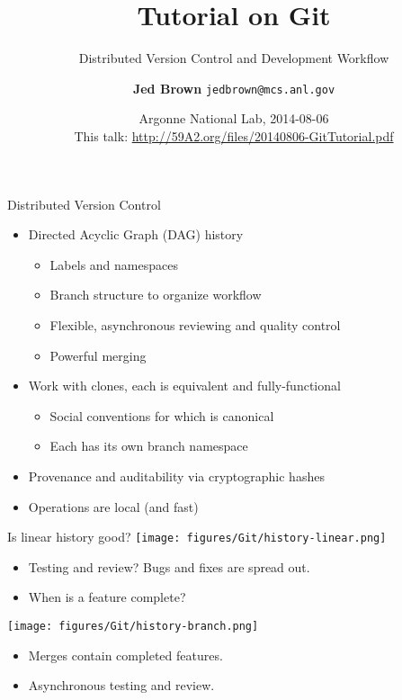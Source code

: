 \documentclass{beamer}
\title{Tutorial on Git}
\subtitle{Distributed Version Control and Development Workflow}
\author{{\bf Jed Brown} \texttt{jedbrown@mcs.anl.gov}}
\date{Argonne National Lab, 2014-08-06 \\[1em]
This talk: \url{http://59A2.org/files/20140806-GitTutorial.pdf}}
\begin{document}
\lstset{language=C}
\normalem

\begin{frame}
  \titlepage
\end{frame}

\begin{frame}{Distributed Version Control}
  \begin{itemize}
  \item Directed Acyclic Graph (DAG) history
    \begin{itemize}
    \item Labels and namespaces
    \item Branch structure to organize workflow
    \item Flexible, asynchronous reviewing and quality control
    \item Powerful merging
    \end{itemize}
  \item Work with clones, each is equivalent and fully-functional
    \begin{itemize}
    \item Social conventions for which is canonical
    \item Each has its own branch namespace
    \end{itemize}
  \item Provenance and auditability via cryptographic hashes
  \item Operations are local (and fast)
  \end{itemize}
\end{frame}

\begin{frame}{Is linear history good?}
  \texttt{[image: figures/Git/history-linear.png]}
  \begin{itemize}
  \item Testing and review?  Bugs and fixes are spread out.
  \item When is a feature complete?
  \end{itemize}
  \texttt{[image: figures/Git/history-branch.png]}
  \begin{itemize}
  \item Merges contain completed features.
  \item Asynchronous testing and review.
  \end{itemize}
\end{frame}
\end{document}

